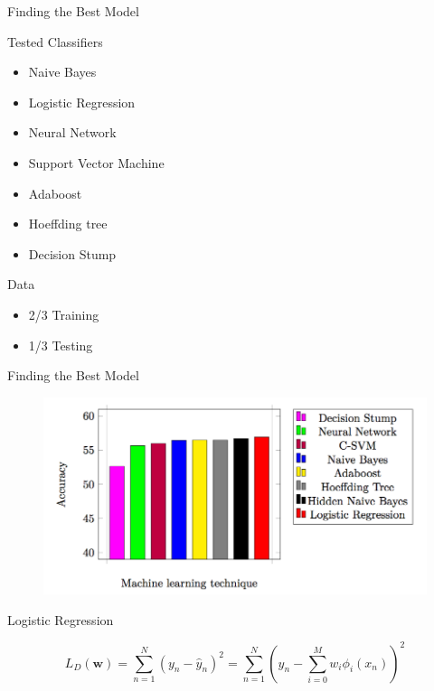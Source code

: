 \begin{frame}{Finding the Best Model}

Tested Classifiers

\begin{itemize}
\item Naive Bayes 
\item Logistic Regression
\item Neural Network
\item Support Vector Machine
\item Adaboost
\item Hoeffding tree
\item Decision Stump
\end{itemize}
Data \begin{itemize}
		\item 2/3 Training
		\item 1/3 Testing
     \end{itemize}
\end{frame}

\begin{frame}{Finding the Best Model}

  \begin{figure}[H]
    \includegraphics[width=\linewidth]{prediction/bestml.png}
  \end{figure}

\end{frame}

\begin{frame}{Logistic Regression}

\[ L_D(\textbf{w}) = \sum_{n=1}^N (y_n-\hat{y}_n)^2 = \sum_{n=1}^N \left(y_n - \sum_{i=0}^M w_i \phi_i(x_n)\right)^{2} \] 

\end{frame}

